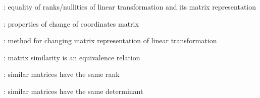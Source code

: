 \item {}: equality of ranks/nullities of
linear transformation and its matrix representation
\item {}: properties of change of coordinates matrix
\item {}: method for changing matrix representation of linear transformation
\item {}: matrix similarity is an equivalence relation
\item {}: similar matrices have the same rank
\item {}: similar matrices have the same determinant


